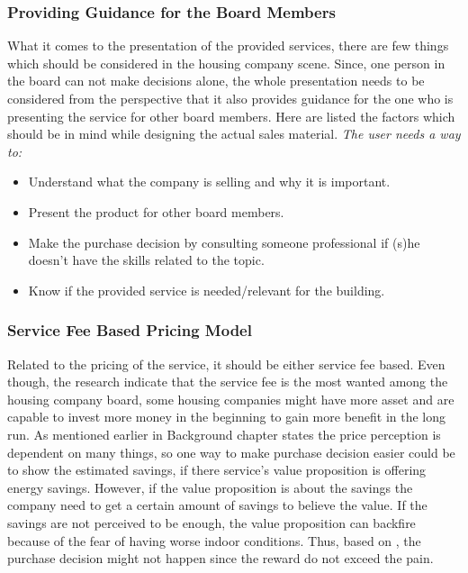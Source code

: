 \subsubsection*{Providing Guidance for the Board Members}

What it comes to the presentation of the provided services, there are few things which should be considered in the housing company scene. Since, one person in the board can not make decisions alone, the whole presentation needs to be considered from the perspective that it also provides guidance for the one who is presenting the service for other board members. Here are listed the factors which should be in mind while designing the actual sales material. \emph{The user needs a way to:}
\begin{itemize}
\item Understand what the company is selling and why it is important.
\item Present the product for other board members.
\item Make the purchase decision by consulting someone professional if (s)he doesn't have the skills related to the topic.
\item Know if the provided service is needed/relevant for the building.
\end{itemize}

\subsubsection*{Service Fee Based Pricing Model}

Related to the pricing of the service, it should be either service fee based. Even though, the research indicate that the service fee is the most wanted among the housing company board, some housing companies might have more asset and are capable to invest more money in the beginning to gain more benefit in the long run. As mentioned earlier in Background chapter \textcite{Decoded:2013} states the price perception is dependent on many things, so one way to make purchase decision easier could be to show the estimated savings, if there service's value proposition is offering energy savings. However, if the value proposition is about the savings the company need to get a certain amount of savings to believe the value. If the savings are not perceived to be enough, the value proposition can backfire because of the fear of having worse indoor conditions. Thus, based on \textcite{Decoded:2013}, the purchase decision might not happen since the reward do not exceed the pain.

